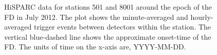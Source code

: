 \begin{figure}[ht]
	\centering
	
	\caption{HiSPARC data for stations 501 and 8001 around the epoch of the FD in July 2012. The plot shows the minute-averaged and hourly-averaged trigger events between detectors within the station. The vertical blue-dashed line shows the approximate onset-time of the FD. The units of time on the x-axis are, YYYY-MM-DD.}
	\label{fig:FD_201207}
\end{figure}

